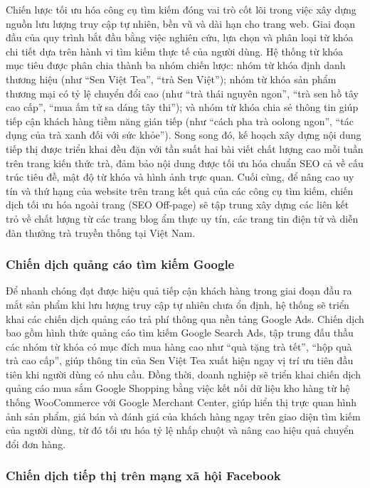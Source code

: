 Chiến lược tối ưu hóa công cụ tìm kiếm đóng vai trò cốt lõi trong việc xây dựng nguồn lưu lượng truy cập tự nhiên, bền vũ và dài hạn cho trang web. Giai đoạn đầu của quy trình bắt đầu bằng việc nghiên cứu, lựa chọn và phân loại từ khóa chi tiết dựa trên hành vi tìm kiếm thực tế của người dùng. Hệ thống từ khóa mục tiêu được phân chia thành ba nhóm chiến lược: nhóm từ khóa định danh thương hiệu (như ``Sen Việt Tea'', ``trà Sen Việt''); nhóm từ khóa sản phẩm thương mại có tỷ lệ chuyển đổi cao (như ``trà thái nguyên ngon'', ``trà sen hồ tây cao cấp'', ``mua ấm tử sa dáng tây thi''); và nhóm từ khóa chia sẻ thông tin giúp tiếp cận khách hàng tiềm năng gián tiếp (như ``cách pha trà oolong ngon'', ``tác dụng của trà xanh đối với sức khỏe''). Song song đó, kế hoạch xây dựng nội dung tiếp thị được triển khai đều đặn với tần suất hai bài viết chất lượng cao mỗi tuần trên trang kiến thức trà, đảm bảo nội dung được tối ưu hóa chuẩn SEO cả về cấu trúc tiêu đề, mật độ từ khóa và hình ảnh trực quan. Cuối cùng, để nâng cao uy tín và thứ hạng của website trên trang kết quả của các công cụ tìm kiếm, chiến dịch tối ưu hóa ngoài trang (SEO Off-page) sẽ tập trung xây dựng các liên kết trỏ về chất lượng từ các trang blog ẩm thực uy tín, các trang tin điện tử và diễn đàn thưởng trà truyền thống tại Việt Nam.

\subsubsection{Chiến dịch quảng cáo tìm kiếm Google}

Để nhanh chóng đạt được hiệu quả tiếp cận khách hàng trong giai đoạn đầu ra mắt sản phẩm khi lưu lượng truy cập tự nhiên chưa ổn định, hệ thống sẽ triển khai các chiến dịch quảng cáo trả phí thông qua nền tảng Google Ads. Chiến dịch bao gồm hình thức quảng cáo tìm kiếm Google Search Ads, tập trung đấu thầu các nhóm từ khóa có mục đích mua hàng cao như ``quà tặng trà tết'', ``hộp quà trà cao cấp'', giúp thông tin của Sen Việt Tea xuất hiện ngay vị trí ưu tiên đầu tiên khi người dùng có nhu cầu. Đồng thời, doanh nghiệp sẽ triển khai chiến dịch quảng cáo mua sắm Google Shopping bằng việc kết nối dữ liệu kho hàng từ hệ thống WooCommerce với Google Merchant Center, giúp hiển thị trực quan hình ảnh sản phẩm, giá bán và đánh giá của khách hàng ngay trên giao diện tìm kiếm của người dùng, từ đó tối ưu hóa tỷ lệ nhấp chuột và nâng cao hiệu quả chuyển đổi đơn hàng.

\subsubsection{Chiến dịch tiếp thị trên mạng xã hội Facebook}

